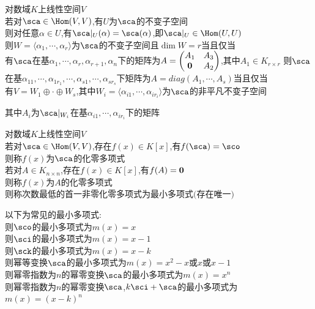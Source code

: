 \begin{dingli}
对数域$K$上线性空间$V$\\
若对$\sca\in \Hom(V,V)$,有$U$为$\sca$的不变子空间\\
则对任意$\alpha\in U$,有$\sca|_{U}(\alpha)=\sca(\alpha)$,即$\sca|_{U}\in \Hom(U,U)$\\
则$W=\langle\alpha_1,\cdots,\alpha_r\rangle$为$\sca$的不变子空间且$\dim W=r$当且仅当\\
有$\sca$在基$\alpha_1,\cdots,\alpha_r,\alpha_{r+1},\alpha_n$下的矩阵为$A=\begin{pmatrix}A_1&A_3\\ {\bf0}&A_2\end{pmatrix}$,其中$A_1\in K_{r\times r}$
则$\sca$在基$\alpha_{11},\cdots,\alpha_{1r_1},\cdots,\alpha_{s1},\cdots,\alpha_{sr_s}$下矩阵为$A=diag(A_1,\cdots,A_s)$当且仅当\\
有$V=W_1\oplus\cdot\oplus W_s$,其中$W_i=\langle\alpha_{i1},\cdots,\alpha_{ir_i}\rangle$为$\sca$的非平凡不变子空间
\end{dingli}

\begin{zhu}
其中$A_i$为$\sca|_{W_i}$在基$\alpha_{i1},\cdots,\alpha_{ir_i}$下的矩阵
\end{zhu}

\begin{dingyi}
对数域$K$上线性空间$V$\\
若对$\sca\in \Hom(V,V)$,存在$f(x)\in K[x]$,有$f(\sca)=\sco$\\
则称$f(x)$为$\sca$的化零多项式\\
若对$A\in K_{n\times n}$,存在$f(x)\in K[x]$,有$f(A)={\bf0}$\\
则称$f(x)$为$A$的化零多项式\\
则称次数最低的首一非零化零多项式为最小多项式$($存在唯一$)$
\end{dingyi}

\begin{zhu}
以下为常见的最小多项式:\\
则$\sco$的最小多项式为$m(x)=x$\\
则$\sci$的最小多项式为$m(x)=x-1$\\
则$\sck$的最小多项式为$m(x)=x-k$\\
则幂等变换$\sca$的最小多项式为$m(x)=x^2-x$或$x$或$x-1$\\
则幂零指数为$n$的幂零变换$\sca$的最小多项式为$m(x)=x^n$\\
则幂零指数为$n$的幂零变换$\sca$,$k\sci+\sca$的最小多项式为$m(x)=(x-k)^n$
\end{zhu}

